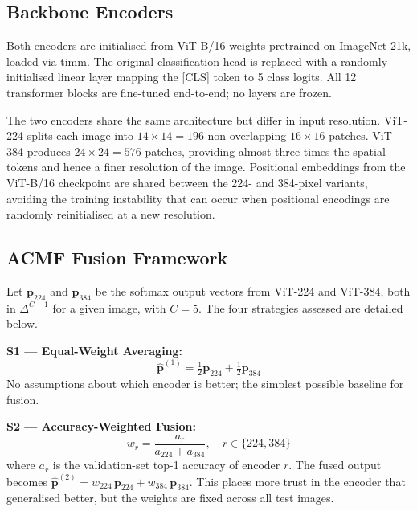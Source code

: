 \documentclass[conference]{IEEEtran}
\begin{document}
\subsection{Backbone Encoders}

Both encoders are initialised from ViT-B/16 \cite{dosovitskiy2021} weights
pretrained on ImageNet-21k, loaded via timm. The original classification head
is replaced with a randomly initialised linear layer mapping the [CLS] token
to 5 class logits. All 12 transformer blocks are fine-tuned end-to-end; no
layers are frozen.

The two encoders share the same architecture but differ in input resolution.
ViT-224 splits each image into $14 \times 14 = 196$ non-overlapping
$16 \times 16$ patches. ViT-384 produces $24 \times 24 = 576$ patches,
providing almost three times the spatial tokens and hence a finer resolution
of the image. Positional embeddings from the ViT-B/16 checkpoint are shared
between the 224- and 384-pixel variants, avoiding the training instability
that can occur when positional encodings are randomly reinitialised at a new
resolution.

\subsection{ACMF Fusion Framework}

Let $\mathbf{p}_{224}$ and $\mathbf{p}_{384}$ be the softmax output vectors
from ViT-224 and ViT-384, both in $\Delta^{C-1}$ for a given image, with
$C = 5$. The four strategies assessed are detailed below.

\textbf{S1 --- Equal-Weight Averaging:}
\begin{equation}
  \hat{\mathbf{p}}^{(1)} = \tfrac{1}{2}\mathbf{p}_{224} + \tfrac{1}{2}\mathbf{p}_{384}
\end{equation}
No assumptions about which encoder is better; the simplest possible baseline
for fusion.

\textbf{S2 --- Accuracy-Weighted Fusion:}
\begin{equation}
  w_{r} = \frac{a_{r}}{a_{224} + a_{384}}, \quad r \in \{224, 384\}
\end{equation}
where $a_r$ is the validation-set top-1 accuracy of encoder $r$. The fused
output becomes $\hat{\mathbf{p}}^{(2)} = w_{224}\,\mathbf{p}_{224} +
w_{384}\,\mathbf{p}_{384}$. This places more trust in the encoder that
generalised better, but the weights are fixed across all test images.
\end{document}
